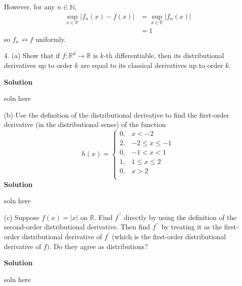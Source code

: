 \documentclass{article}
\begin{document}
However, for any $n \in \mathbb{N}$,
%
\begin{align*}
    \sup_{x \in \mathbb{R}} |f_n(x) - f(x)|
        &= \sup_{x \in \mathbb{R}} |f_n(x)| \\
        &= 1
\end{align*}
%
so $f_n \not\to f$ uniformly.

\newpage

4. (a) Show that if $f : \mathbb{R}^{d} \rightarrow \mathbb{R}$ is
$k$-th differentiable, then its distributional derivatives up to order
$k$ are equal to its classical derivatives up to order $k$.

\textbf{Solution}

soln here

\vspace{5mm}

(b) Use the definition of the distributional derivative to find the
first-order derivative (in the distributional sense) of the function
%
\begin{equation*}
    h(x) =
        \begin{cases}
            0, & x < -2 \\
            2, & -2 \leq x \leq -1 \\
            0, & -1 < x < 1 \\
            1, & 1 \leq x \leq 2 \\
            0, & x > 2 \\
        \end{cases}
\end{equation*}
%
\textbf{Solution}

soln here

\vspace{5mm}

(c) Suppose $f(x) = |x|$ on $\mathbb{R}$. Find $f^{\prime \prime}$
directly by using the definition of the second-order distributional
derivative. Then find $f^{\prime \prime}$ by treating it as the
first-order distributional derivative of $f^{\prime}$ (which is the
first-order distributional derivative of $f)$. Do they agree as
distributions?

\textbf{Solution}

soln here
\end{document}
